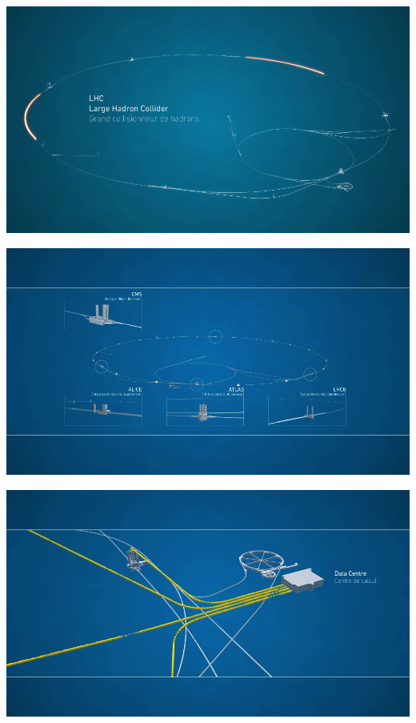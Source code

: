 \documentclass{beamer}
\begin{document}
\begin{frame}
    \includegraphics[width=\textwidth]{video/lhc.png}
\end{frame}

\begin{frame}
    \includegraphics[width=\textwidth]{video/detectors.png}
\end{frame}

\begin{frame}
    \includegraphics[width=\textwidth]{video/data_center.png}
\end{frame}
\end{document}
